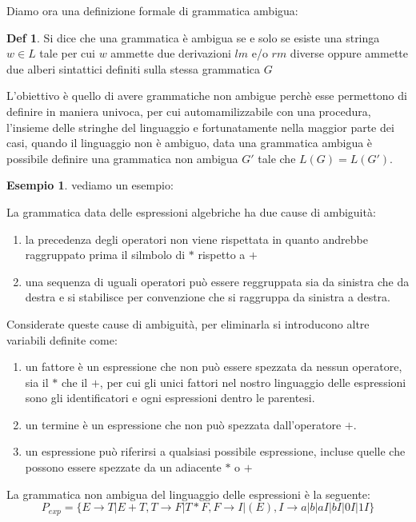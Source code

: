 \documentclass[a4paper]{book}
\theoremstyle{definition}%
\newtheorem*{defi}{Def}%
\newtheorem*{esempio}{Esempio}
\begin{document}
Diamo ora una definizione formale di grammatica ambigua:
  \begin{defi}
    Si dice che una grammatica è ambigua se e solo se esiste una stringa $w \in L$ tale per cui $w$ ammette due derivazioni $lm$ e/o $rm$
    diverse oppure ammette due alberi sintattici definiti sulla stessa grammatica $G$
  \end{defi}
  L'obiettivo è quello di avere grammatiche non ambigue perchè esse permettono di definire in maniera univoca, per cui automamilizzabile
  con una procedura, l'insieme delle stringhe del linguaggio e fortunatamente nella maggior parte dei casi, quando il linguaggio non è ambiguo,
  data una grammatica ambigua è possibile definire una grammatica non ambigua $G'$ tale che $L(G) = L(G')$.
\begin{esempio}
vediamo un esempio:

La grammatica data delle espressioni algebriche ha due cause di ambiguità:
\begin{enumerate}
  \item la precedenza degli operatori non viene rispettata in quanto andrebbe raggruppato prima il silmbolo di $*$ rispetto a $+$
  \item una sequenza di uguali operatori può essere reggruppata sia da sinistra che da destra e si stabilisce per convenzione
    che si raggruppa da sinistra a destra.
\end{enumerate}
  Considerate queste cause di ambiguità, per eliminarla si introducono altre variabili definite come:
  \begin{enumerate}
  \item un fattore è un espressione che non può essere spezzata da nessun operatore, sia il $*$ che il $+$, per cui gli unici fattori
    nel nostro linguaggio delle espressioni sono gli identificatori e ogni espressioni dentro le parentesi.
  \item un termine è un espressione che non può spezzata dall'operatore $+$.
  \item un espressione può riferirsi a qualsiasi possibile espressione, incluse quelle che possono essere spezzate da un adiacente $*$ o $+$
  \end{enumerate}
  La grammatica non ambigua del linguaggio delle espressioni è la seguente:
  \begin{equation*}
    P_{exp} = \{E \to T | E + T, T \to F | T * F,F \to I | (E), I \to a | b | aI| bI | 0I | 1I\}
  \end{equation*}
\end{esempio}
\end{document}
